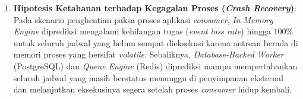 \begin{enumerate}[noitemsep]
	\item \textbf{Hipotesis Ketahanan terhadap Kegagalan Proses (\textit{Crash Recovery})}: Pada skenario penghentian paksa proses aplikasi \textit{consumer}, \textit{In-Memory Engine} diprediksi mengalami kehilangan tugas (\textit{event loss rate}) hingga $100\%$ untuk seluruh jadwal yang belum sempat dieksekusi karena antrean berada di memori proses yang bersifat \textit{volatile}. Sebaliknya, \textit{Database-Backed Worker} (PostgreSQL) dan \textit{Queue Engine} (Redis) diprediksi mampu mempertahankan seluruh jadwal yang masih berstatus menunggu di penyimpanan eksternal dan melanjutkan eksekusinya segera setelah proses \textit{consumer} hidup kembali.
\end{enumerate}
